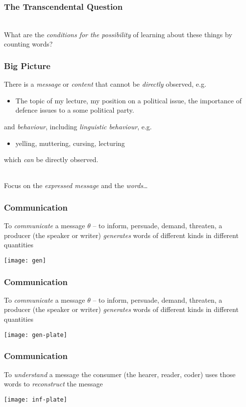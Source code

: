 \documentclass[11pt,compress,professionalfonts]{beamer}
\newcommand{\ita}{\begin{itemize}}
\newcommand{\itm}{\item[]}
\newcommand{\itz}{\end{itemize}}
\begin{document}
\begin{frame}[t,fragile]\frametitle{The Transcendental Question}
~\\
What are the \textit{conditions for the possibility} of learning about these things by counting words?

\end{frame}
\begin{frame}[t,fragile]\frametitle{Big Picture}

There is a \textsl{message} or \textit{content} that cannot be \textit{directly} observed, e.g.
\ita
\itm The topic of my lecture, my position on a political issue, the importance of defence issues to a some political party.
\itz
and \textit{behaviour}, including \textsl{linguistic behaviour}, e.g.
\ita
\itm yelling, muttering, cursing, lecturing
\itz
which \textit{can} be directly observed.

~\\
Focus on the \textit{expressed message} and the \textit{words}\ldots

\end{frame}
\begin{frame}[t,fragile]\frametitle{Communication}

To \textsl{communicate} a message $\theta$ -- to inform, persuade, demand, threaten, a producer (the speaker or writer) \textsl{generates} words of different kinds in different quantities


\begin{center}
\texttt{[image: gen]}
\end{center}

\end{frame}
\begin{frame}[t,fragile]\frametitle{Communication}

To \textsl{communicate} a message $\theta$ -- to inform, persuade, demand, threaten, a producer (the speaker or writer) \textsl{generates} words of different kinds in different quantities


\begin{center}
\texttt{[image: gen-plate]}
\end{center}


\end{frame}
\begin{frame}[t,fragile]\frametitle{Communication}

To \textsl{understand} a message the consumer (the hearer, reader, coder) uses those words to \textsl{reconstruct} the message

\begin{center}
\texttt{[image: inf-plate]}
\end{center}



\end{frame}
\end{document}
